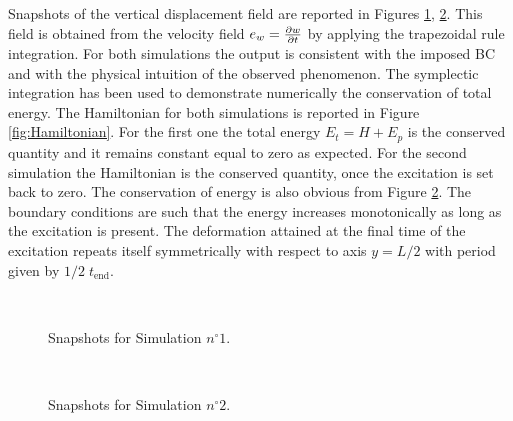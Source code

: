 \documentclass[11pt]{article}
\begin{document}
	Snapshots of the vertical displacement field are reported in Figures \ref{fig:sim1}, \ref{fig:sim2}. This field is obtained from the velocity field $e_w = \diffp{w}{t}$ by applying the trapezoidal rule integration. For both simulations the output is consistent with the imposed BC and with the physical intuition of the observed phenomenon. The symplectic integration has been used to demonstrate numerically the conservation of total energy. The Hamiltonian for both simulations is reported in Figure \ref{fig:Hamiltonian}. For the first one the total energy $E_t = H + E_p$ is the conserved quantity and it remains constant equal to zero as expected. For the second simulation the Hamiltonian is the conserved quantity, once the excitation is set back to zero. The conservation of energy is also obvious from Figure \ref{fig:sim2}. The boundary conditions are such that the energy increases monotonically as long as the excitation is present.  The deformation attained at the final time of the excitation  repeats itself symmetrically with respect to axis $y = L/2$ with period given by $1/2 \; t_{\text{end}}$.

\begin{figure}[t]%
	\centering
	\hspace{8pt}%
	 \\
	\hspace{8pt}%
	\caption[Snapshots of the displacement field]{Snapshots for Simulation $n^\circ 1$.}%
	\label{fig:sim1}%
\end{figure}
\begin{figure}[h]%
	\centering
	\hspace{8pt}%
	 \\
	\hspace{8pt}%
	\caption[Snapshots of the displacement field]{Snapshots for Simulation $n^\circ 2$.}%
	\label{fig:sim2}%
\end{figure}
	
\end{document}
